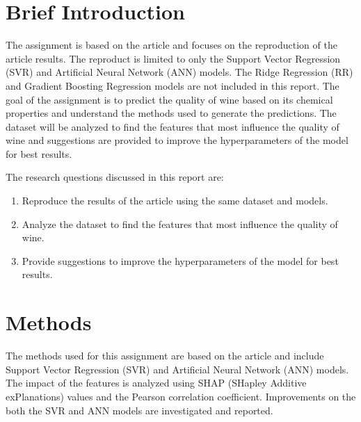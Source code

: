 \documentclass{article}
\begin{document}

\section{Brief Introduction}
The assignment is based on the article \cite{dahal2021prediction} and focuses on the reproduction of the article results.
The reproduct is limited to only the Support Vector Regression (SVR) and Artificial Neural Network (ANN) models.
The Ridge Regression (RR) and Gradient Boosting Regression models are not included in this report.
The goal of the assignment is to predict the quality of wine based on its chemical properties and understand the methods used to generate the predictions.
The dataset will be analyzed to find the features that most influence the quality of wine and suggestions are provided to improve the hyperparameters of the model for best results.

The research questions discussed in this report are:
\begin{enumerate}
    \item Reproduce the results of the article \cite{dahal2021prediction} using the same dataset and models.
    \item Analyze the dataset to find the features that most influence the quality of wine.
    \item Provide suggestions to improve the hyperparameters of the model for best results.
\end{enumerate}

\section{Methods}
The methods used for this assignment are based on the article \cite{dahal2021prediction} and include Support Vector Regression (SVR) and Artificial Neural Network (ANN) models.
The impact of the features is analyzed using SHAP (SHapley Additive exPlanations) values and the Pearson correlation coefficient. Improvements on the both the SVR and ANN models are investigated and reported.
\end{document}
